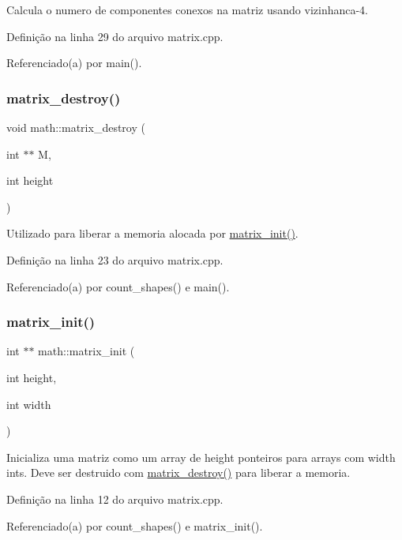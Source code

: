 Calcula o numero de componentes conexos na matriz usando vizinhanca-\/4. 



Definição na linha 29 do arquivo matrix.\+cpp.



Referenciado(a) por main().

\mbox{\label{namespacemath_ab71def2c0ba5a16ca9b8b0ad9ed7034f}} 
\subsubsection{\texorpdfstring{matrix\_destroy()}{matrix\_destroy()}}
{\footnotesize\ttfamily void math\+::matrix\+\_\+destroy (\begin{DoxyParamCaption}\item[{int $\ast$$\ast$}]{M,  }\item[{int}]{height }\end{DoxyParamCaption})}



Utilizado para liberar a memoria alocada por \mbox{\hyperlink{namespacemath_ac47b11361b7d12063c2c2d3c3f030e6d}{matrix\+\_\+init()}}. 



Definição na linha 23 do arquivo matrix.\+cpp.



Referenciado(a) por count\+\_\+shapes() e main().

\mbox{\label{namespacemath_ac47b11361b7d12063c2c2d3c3f030e6d}} 
\subsubsection{\texorpdfstring{matrix\_init()}{matrix\_init()}}
{\footnotesize\ttfamily int $\ast$$\ast$ math\+::matrix\+\_\+init (\begin{DoxyParamCaption}\item[{int}]{height,  }\item[{int}]{width }\end{DoxyParamCaption})}



Inicializa uma matriz como um array de height ponteiros para arrays com width ints. Deve ser destruido com \mbox{\hyperlink{namespacemath_ab71def2c0ba5a16ca9b8b0ad9ed7034f}{matrix\+\_\+destroy()}} para liberar a memoria. 



Definição na linha 12 do arquivo matrix.\+cpp.



Referenciado(a) por count\+\_\+shapes() e matrix\+\_\+init().

